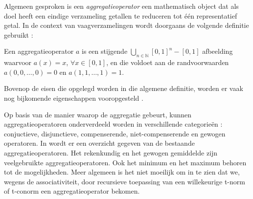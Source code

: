 Algemeen gesproken is een \emph{aggregatieoperator} een mathematisch object dat als doel heeft
een eindige verzameling getallen te reduceren tot \'e\'en representatief getal. In de context van 
vaagverzamelingen wordt doorgaans de volgende definitie gebruikt 
\cite{detyniecki:numerical_aggregation_operators}:
\begin{definitie}
Een aggregatieoperator $a$ is een stijgende $\bigcup_{n \in \mathbb{N}}[0,1]^n - [0,1]$ afbeelding
waarvoor $a(x)=x$, $\forall x \in [0,1]$, en die voldoet aan de randvoorwaarden 
$a(0,0,\ldots,0)=0$ en $a(1,1,\ldots,1)=1$.
\end{definitie}
\noindent
Bovenop de eisen die opgelegd worden in die algemene definitie, worden er vaak nog
bijkomende eigenschappen vooropgesteld 
\cite{detyniecki:numerical_aggregation_operators, grabisch:fuzzy_aggregation_of_numerical_preferences, victor:aggregatieoperatoren}.

Op basis van de manier waarop de aggregatie gebeurt, kunnen aggregatieoperatoren onderverdeeld
worden in verschillende categorie\"en \cite{grabisch:fuzzy_aggregation_of_numerical_preferences}:
conjuctieve, disjunctieve, compenserende, niet-compenserende en gewogen operatoren.
In \cite{detyniecki:numerical_aggregation_operators} wordt er een overzicht gegeven van
de bestaande aggregatieoperatoren. Het rekenkundig en het gewogen gemiddelde zijn
veelgebruikte aggregatieoperatoren. Ook het minimum en het maximum behoren
tot de mogelijkheden. Meer algemeen is het niet moeilijk om in te zien 
dat we, wegens de associativiteit, door recursieve toepassing van een willekeurige
t-norm of t-conorm een aggregatieoperator bekomen.
